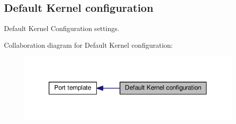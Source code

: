 \hypertarget{group__template__kern__cfg}{\subsection{Default Kernel configuration}
\label{group__template__kern__cfg}
}


Default Kernel Configuration settings.  


Collaboration diagram for Default Kernel configuration\-:\nopagebreak
\begin{figure}[H]
\begin{center}
\leavevmode
\includegraphics[width=330pt]{group__template__kern__cfg}
\end{center}
\end{figure}
